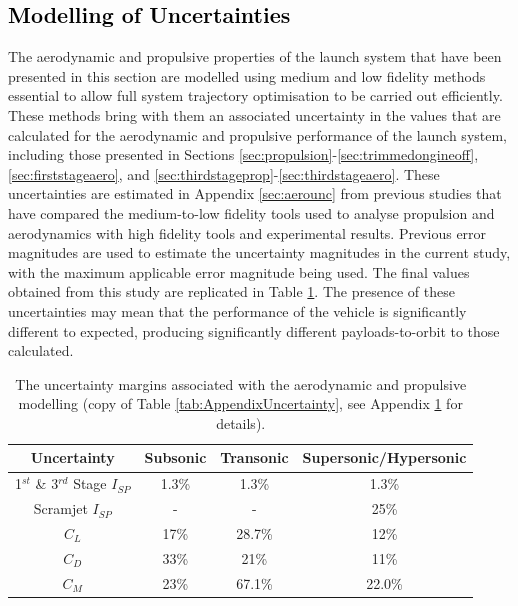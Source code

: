 \textcolor{black}{
	\section{Modelling of Uncertainties}\label{sec:unc}
}
\noindent
The aerodynamic and propulsive properties of the launch system that have been presented in this section are modelled using medium and low fidelity methods essential to allow full system trajectory optimisation to be carried out efficiently. These methods bring with them an associated uncertainty in the values that are calculated for the aerodynamic and propulsive performance of the launch system, including those presented in Sections \ref{sec:propulsion}-\ref{sec:trimmedongineoff}, \ref{sec:firststageaero}, and \ref{sec:thirdstageprop}-\ref{sec:thirdstageaero}. These uncertainties are estimated in Appendix \ref{sec:aerounc} from previous studies that have compared the medium-to-low fidelity tools used to analyse propulsion and aerodynamics with high fidelity tools and experimental results. Previous error magnitudes are used to estimate the uncertainty magnitudes in the current study, with the maximum applicable error magnitude being used. The final values obtained from this study are replicated in Table \ref{tab:AppendixUncertaintyCopy}. The presence of these uncertainties may mean that the performance of the vehicle is significantly different to expected, producing significantly different payloads-to-orbit to those calculated. 

\begin{table}[ht]
	\centering
	\begin{tabular}{|c|c|c|c|}
		\hline  Uncertainty & Subsonic & Transonic  & Supersonic/Hypersonic \\ 
		\hline  1$^{st}$ \& 3$^{rd}$ Stage $I_{SP}$ & 1.3\% & 1.3\% &  1.3\% \\ 
		\hline  Scramjet $I_{SP}$ & - & - &  25\% \\ 
		\hline   $C_L$ & 17\% & 28.7\% & 12\% \\  
		\hline   $C_D$ & 33\% & 21\% & 11\% \\  
		\hline   $C_M$  & 23\% & 67.1\% &  22.0\% \\ 
		\hline 
	\end{tabular}
	\caption{The uncertainty margins associated with the aerodynamic and propulsive modelling (copy of Table \ref{tab:AppendixUncertainty}, see Appendix \ref{tab:AppendixUncertaintyCopy} for details).}
	\label{tab:AppendixUncertaintyCopy}
\end{table}


